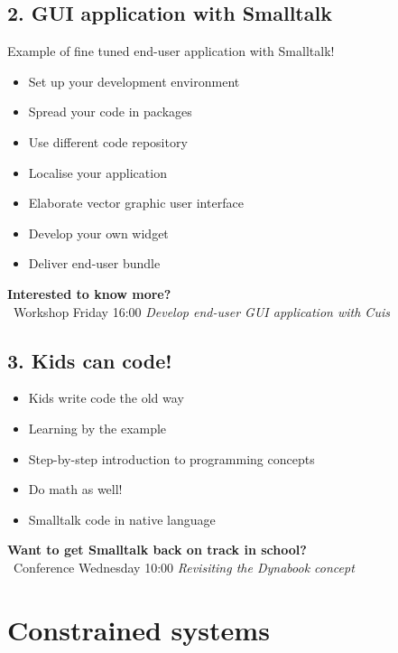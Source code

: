 \documentclass{beamer}
\newcommand{\tip}{\boldmath{\textcolor{red}{$\Rightarrow$}}}
\begin{document}
\subsection{2. GUI application with Smalltalk}
\begin{frame}
Example of fine tuned end-user application with \alert{Smalltalk}!
\begin{itemize}
\item Set up your development environment
\item Spread your code in packages
\item Use different code repository 
\item Localise your application
\item Elaborate vector graphic user interface
\item Develop your own widget
\item Deliver end-user bundle
\end{itemize}
\vspace*{1cm}
\textbf{Interested to know more?} \\
\tip\ Workshop Friday 16:00 \alert{\emph{Develop end-user GUI
  application with Cuis}}
\end{frame}

\subsection{3. Kids can code!}
\begin{frame}
  \begin{itemize}
  \item Kids write code the old way 
  \item Learning by the example
  \item Step-by-step introduction to programming concepts
  \item Do math as well!
  \item \alert{Smalltalk} code in native language
  \end{itemize}
  \vspace*{1cm}
  \textbf{Want to get Smalltalk back on track in school?} \\
  \tip\ Conference Wednesday 10:00 \alert{\emph{Revisiting the
    Dynabook concept}}
\end{frame}

\section{Constrained systems}
\end{document}
